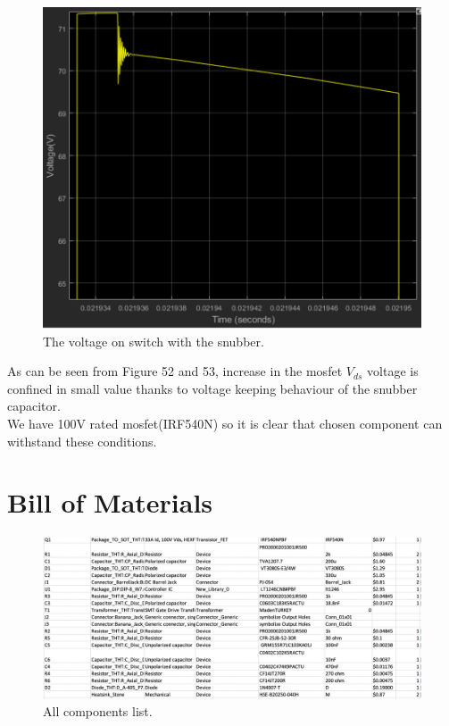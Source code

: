 \documentclass{article}
\begin{document}
\begin{figure}[H]
    \centering
    \includegraphics[scale=0.6]{wsnb.png}
    \caption{The voltage on switch with the snubber.}
    \label{fig:my_label}
\end{figure}
\newpage
As can be seen from Figure 52 and 53, increase in the mosfet $V_{ds}$ voltage is confined in small value thanks to voltage keeping behaviour of the snubber capacitor.\\

 We have 100V rated mosfet(IRF540N) so it is clear that chosen component can withstand these conditions.\\



\section{Bill of Materials}

\begin{figure}[H]
    \centering
    \includegraphics[scale=0.4]{BOM.png}
    \caption{All components list.}
    \label{fig:my_label}
\end{figure}
\end{document}
